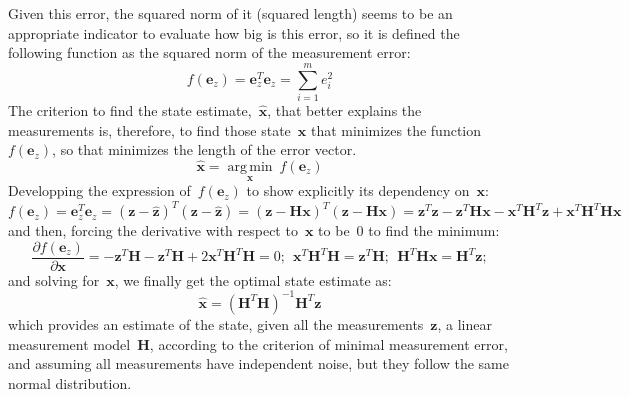 Given this error, the squared norm of it (squared length) seems to be an appropriate indicator to evaluate how big is this error, so it is defined the following function as the squared norm of the measurement error:
\begin{equation}
 f(\mathbf{e}_z) = \mathbf{e}^T_z\mathbf{e}_z = \sum^m_{i=1}e^2_i
\end{equation}
The criterion to find the state estimate,~$\hat{\mathbf{x}}$, that better explains the measurements is, therefore, to find those state~$\mathbf{x}$ that minimizes the function~$f(\mathbf{e}_z)$, so that minimizes the length of the error vector.
\begin{equation}
 \hat{\mathbf{x}} = \operatorname*{arg\,min}_{\mathbf{x}}\ f(\mathbf{e}_z)
\end{equation}
Developping the  expression of~$f(\mathbf{e}_z)$ to show explicitly its dependency on~$\mathbf{x}$:
\begin{equation}
 f(\mathbf{e}_z) = \mathbf{e}^T_z\mathbf{e}_z = (\mathbf{z}-\hat{\mathbf{z}})^T (\mathbf{z}-\hat{\mathbf{z}})
		 = (\mathbf{z}-\mathbf{H}\mathbf{x})^T(\mathbf{z}-\mathbf{H}\mathbf{x})
		 = \mathbf{z}^T\mathbf{z} - \mathbf{z}^T\mathbf{H}\mathbf{x} - \mathbf{x}^T\mathbf{H}^T\mathbf{z} + \mathbf{x}^T\mathbf{H}^T\mathbf{H}\mathbf{x}
\end{equation}
and then, forcing the derivative with respect to~$\mathbf{x}$ to be~$0$ to find the minimum:
\begin{equation}
  \frac{\partial f(\mathbf{e}_z)}{\partial \mathbf{x}} 
	= -\mathbf{z}^T\mathbf{H} -\mathbf{z}^T\mathbf{H} + 2\mathbf{x}^T\mathbf{H}^T\mathbf{H} = 0;
  \ \ \mathbf{x}^T\mathbf{H}^T\mathbf{H} = \mathbf{z}^T\mathbf{H};
  \ \ \mathbf{H}^T\mathbf{H}\mathbf{x} = \mathbf{H}^T\mathbf{z};
\end{equation}
and solving for~$\mathbf{x}$, we finally get the optimal state estimate as:
\begin{equation}
\label{eq:ul_least_squares}
 \hat{\mathbf{x}} = (\mathbf{H}^T\mathbf{H})^{-1}\mathbf{H}^T\mathbf{z}
\end{equation}
which provides an estimate of the state, given all the measurements~$\mathbf{z}$, a linear measurement model~$\mathbf{H}$, according to the criterion of minimal measurement error, and assuming all measurements have independent noise, but they follow the same normal distribution. 

